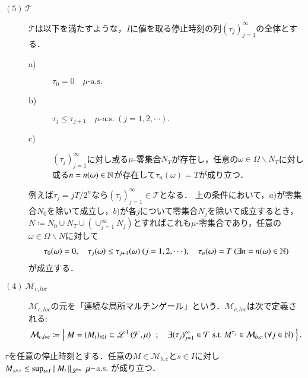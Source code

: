 \begin{description}
		\item[$\mathrm{(5)}\ \mathcal{T}$]
			$\mathcal{T}$は以下を満たすような，$I$に値を取る停止時刻の列$(\tau_j)_{j=1}^{\infty}$の全体とする．
			\begin{description}
				\item[a)] $\tau_0 = 0 \quad \mbox{$\mu$-a.s.}$
				\item[b)] $\tau_j \leq \tau_{j+1} \quad \mbox{$\mu$-a.s.}\ (j=1,2,\cdots).$
				\item[c)] $(\tau_j)_{j=1}^{\infty}$に対し或る$\mu$-零集合$N_T$が存在し，任意の$\omega \in \Omega \backslash N_T$に対し或る$n = n(\omega) \in \mathbb{N}$が存在して$\tau_n(\omega)=T$が成り立つ．
			\end{description}
			例えば$\tau_j = jT/2^n$なら$(\tau_j)_{j=1}^{\infty} \in \mathcal{T}$となる．
			上の条件において，$a)$が零集合$N_0$を除いて成立し，$b)$が各$j$について零集合$N_j$を除いて成立するとき，
			$N \coloneqq N_0 \cup N_T \cup (\cup_{j=1}^{\infty}N_j)$とすればこれも$\mu$-零集合であり，任意の$\omega \in \Omega \backslash N$に対して
			\begin{align}
				\tau_0(\omega) = 0,\quad \tau_j(\omega) \leq \tau_{j+1}(\omega)\ (j=1,2,\cdots),\quad
				\tau_n(\omega) = T\ (\exists n = n(\omega) \in \mathbb{N})
			\end{align}
			が成立する．
			
		\item[$\mathrm{(4)}\ \mathcal{M}_{c,loc}$]
			$\mathcal{M}_{c,loc}$の元を「連続な局所マルチンゲール」という．$\mathcal{M}_{c,loc}$は次で定義される:
			\begin{align}
				\mathcal{M}_{c,loc} \coloneqq 
				\left\{\ M = (M_t)_{t \in I} \subset \mathscr{L}^{1} \left(\mathcal{F},\mu\right)\ \, ; \quad \exists (\tau_j)_{j=1}^{\infty} \in \mathcal{T}\ \mathrm{s.t.}\ M^{\tau_j} \in \mathcal{M}_{b,c}\ (\forall j \in \mathbb{N})\ \right\}.
			\end{align}
	\end{description}
	
	\begin{screen}
		\begin{thm}[有界なマルチンゲールを停止時刻で停めた過程の有界性]
			$\tau$を任意の停止時刻とする．任意の$M \in \mathcal{M}_{b,c}$と$s \in I$に対し
			$M_{s \wedge \tau} \leq \operatorname*{sup}_{t \in I} \left\|\, M_t\, \right\|_{\mathscr{L}^\infty}\ \mu-$a.s.
			が成り立つ．
			\label{thm:boundedness_of_stopped_process_of_bounded_martingale}
		\end{thm}
	\end{screen}
	
